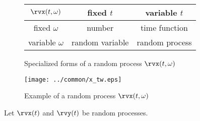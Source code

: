 \begin{figure}[ht]\color{figcolor}
\begin{center}
   \begin{tabular}{|c||c|c|}
      \hline
         $\rvx(t,\omega)$ &  fixed $t$      & variable $t$   \\
      \hline
      \hline
         fixed    $\omega$ & number          & time function  \\
      \hline
         variable $\omega$ & random variable & random process \\
      \hline
   \end{tabular}
\caption{
   Specialized forms of a random process $\rvx(t,\omega)$
   \label{fig:X(t,w)}
   }
\end{center}
\end{figure}

\begin{figure}[ht]\color{figcolor}
\begin{center}
\texttt{[image: ../common/x\_tw.eps]}
\end{center}
\caption{
  Example of a random process $\rvx(t,\omega)$
  \label{fig:X(t,w)graph}
}
\end{figure}


\begin{definition}
\label{def:Rxx}
\label{def:opR}
\label{def:Rxy}
Let $\rvx(t)$ and $\rvy(t)$ be random processes.\\
\end{definition}


